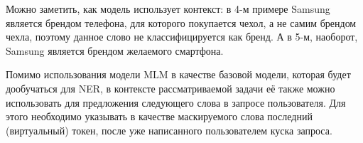 \documentclass[12pt,a4paper]{article}
\begin{document}
\noindent Можно заметить, как модель использует контекст: в 4-м примере Samsung является брендом телефона, для которого покупается чехол, а не самим брендом чехла, поэтому данное слово не классифицируется как бренд. А в 5-м, наоборот, Samsung является брендом желаемого смартфона.

\begin{table}[H]
\begin{center}
\caption{Примеры предсказаний замаскированных слов.}
\end{center}
\end{table}

\noindent Помимо использования модели MLM в качестве базовой модели, которая будет дообучаться для NER, в контексте рассматриваемой задачи её также можно использовать для предложения следующего слова в запросе пользователя. Для этого необходимо указывать в качестве маскируемого слова последний (виртуальный) токен, после уже написанного пользователем куска запроса.
\end{document}

